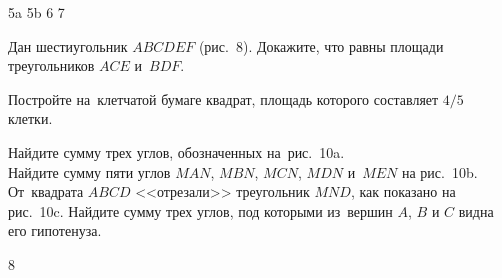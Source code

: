 \vfill

\begin{center}

 {5a}{}
 {5b}{}
 {6} {}
 {7} {\vspace{1ex}}

\end{center}

\vfill
\clearpage

\begin{problems}

\item
Дан шестиугольник $ABCDEF$ (рис.~8).
Докажите, что равны площади треугольников $ACE$ и~$BDF$.

\item
Постройте на~клетчатой бумаге квадрат, площадь которого составляет
$4/5$ клетки.

\item
\subproblem
Найдите сумму трех углов, обозначенных на~рис.~10a.
\\
\subproblem
Найдите сумму пяти углов $MAN$, $MBN$, $MCN$, $MDN$ и~$MEN$ на рис.~10b.
\\
\subproblem
От~квадрата $ABCD$ <<отрезали>> треугольник $MND$, как показано на рис.~10c.
Найдите сумму трех углов, под которыми из~вершин $A$, $B$ и $C$ видна его
гипотенуза.

\end{problems}

\vfill

\begin{center}

 {8} {}

\end{center}

\vfill
\clearpage

\endgroup %

